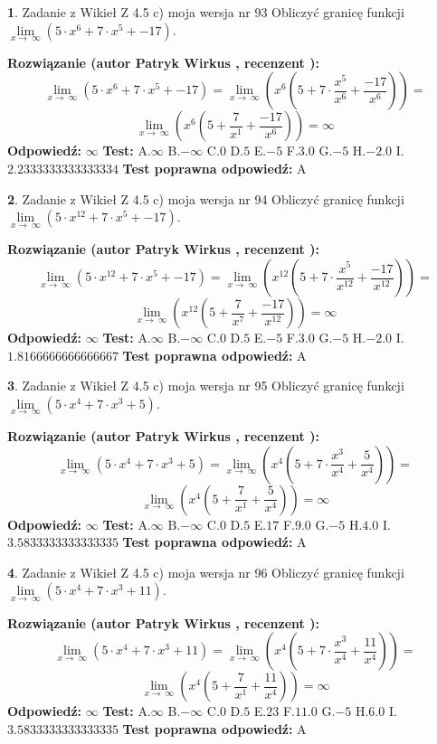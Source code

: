 \documentclass[12pt, a4paper]{article}
\theoremstyle{definition} %
\newtheorem{zad}{}
\newcommand{\zadStart}[1]{\begin{zad}#1\newline}
\newcommand{\zadStop}{\end{zad}}
\newcommand{\rozwStart}[2]{\noindent \textbf{Rozwiązanie (autor #1 , recenzent #2): }\newline}
\newcommand{\rozwStop}{\newline}
\newcommand{\odpStart}{\noindent \textbf{Odpowiedź:}\newline}
\newcommand{\odpStop}{\newline}
\newcommand{\testStart}{\noindent \textbf{Test:}\newline}
\newcommand{\testStop}{\newline}
\newcommand{\kluczStart}{\noindent \textbf{Test poprawna odpowiedź:}\newline}
\newcommand{\kluczStop}{\newline}
\begin{document}
\zadStart{Zadanie z Wikieł Z 4.5 c) moja wersja nr 93}
Obliczyć granicę funkcji  $\lim\limits_{x\to\ \infty}(5 \cdot x^{6}+7 \cdot x^{5}+-17)$.
\zadStop
\rozwStart{Patryk Wirkus}{}
$$\lim\limits_{x\to\ \infty}(5 \cdot x^{6}+7 \cdot x^{5}+-17) = \lim\limits_{x\to\ \infty}(x^{6}(5 +7 \cdot \frac{x^{5}}{x^{6}}+\frac{-17}{x^{6}})) =$$ $$\lim\limits_{x\to\ \infty}(x^{6}(5 +\frac{7}{x^{1}}+\frac{-17}{x^{6}})) =\infty$$
\rozwStop
\odpStart
$\infty$
\odpStop
\testStart
A.$\infty$ B.$-\infty$ C.$0$ D.$5$ E.$-5$
F.$3.0$ G.$-5$
H.$-2.0$
I.$2.2333333333333334$
\testStop
\kluczStart
A
\kluczStop



\zadStart{Zadanie z Wikieł Z 4.5 c) moja wersja nr 94}
Obliczyć granicę funkcji  $\lim\limits_{x\to\ \infty}(5 \cdot x^{12}+7 \cdot x^{5}+-17)$.
\zadStop
\rozwStart{Patryk Wirkus}{}
$$\lim\limits_{x\to\ \infty}(5 \cdot x^{12}+7 \cdot x^{5}+-17) = \lim\limits_{x\to\ \infty}(x^{12}(5 +7 \cdot \frac{x^{5}}{x^{12}}+\frac{-17}{x^{12}})) =$$ $$\lim\limits_{x\to\ \infty}(x^{12}(5 +\frac{7}{x^{7}}+\frac{-17}{x^{12}})) =\infty$$
\rozwStop
\odpStart
$\infty$
\odpStop
\testStart
A.$\infty$ B.$-\infty$ C.$0$ D.$5$ E.$-5$
F.$3.0$ G.$-5$
H.$-2.0$
I.$1.8166666666666667$
\testStop
\kluczStart
A
\kluczStop



\zadStart{Zadanie z Wikieł Z 4.5 c) moja wersja nr 95}
Obliczyć granicę funkcji  $\lim\limits_{x\to\ \infty}(5 \cdot x^{4}+7 \cdot x^{3}+5)$.
\zadStop
\rozwStart{Patryk Wirkus}{}
$$\lim\limits_{x\to\ \infty}(5 \cdot x^{4}+7 \cdot x^{3}+5) = \lim\limits_{x\to\ \infty}(x^{4}(5 +7 \cdot \frac{x^{3}}{x^{4}}+\frac{5}{x^{4}})) =$$ $$\lim\limits_{x\to\ \infty}(x^{4}(5 +\frac{7}{x^{1}}+\frac{5}{x^{4}})) =\infty$$
\rozwStop
\odpStart
$\infty$
\odpStop
\testStart
A.$\infty$ B.$-\infty$ C.$0$ D.$5$ E.$17$
F.$9.0$ G.$-5$
H.$4.0$
I.$3.5833333333333335$
\testStop
\kluczStart
A
\kluczStop



\zadStart{Zadanie z Wikieł Z 4.5 c) moja wersja nr 96}
Obliczyć granicę funkcji  $\lim\limits_{x\to\ \infty}(5 \cdot x^{4}+7 \cdot x^{3}+11)$.
\zadStop
\rozwStart{Patryk Wirkus}{}
$$\lim\limits_{x\to\ \infty}(5 \cdot x^{4}+7 \cdot x^{3}+11) = \lim\limits_{x\to\ \infty}(x^{4}(5 +7 \cdot \frac{x^{3}}{x^{4}}+\frac{11}{x^{4}})) =$$ $$\lim\limits_{x\to\ \infty}(x^{4}(5 +\frac{7}{x^{1}}+\frac{11}{x^{4}})) =\infty$$
\rozwStop
\odpStart
$\infty$
\odpStop
\testStart
A.$\infty$ B.$-\infty$ C.$0$ D.$5$ E.$23$
F.$11.0$ G.$-5$
H.$6.0$
I.$3.5833333333333335$
\testStop
\kluczStart
A
\kluczStop
\end{document}
